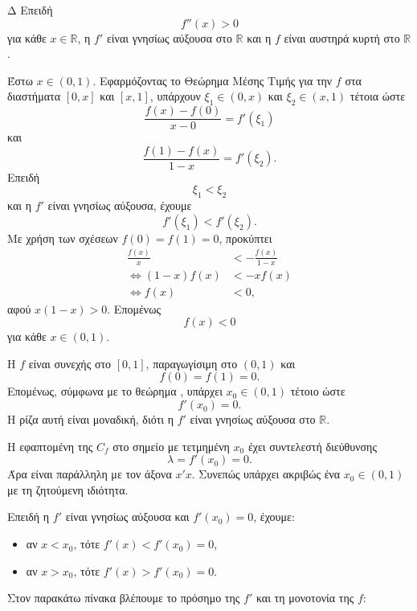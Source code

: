 \begin{thema}{Δ}
Επειδή
\[
f''(x)>0
\]
για κάθε $x\in\mathbb{R}$, η $f'$ είναι γνησίως αύξουσα στο $\mathbb{R}$ και η $f$ είναι αυστηρά κυρτή στο $\mathbb{R}$.
\begin{erwthma}
\item Έστω $x\in(0,1)$. Εφαρμόζοντας το Θεώρημα Μέσης Τιμής για την $f$ στα διαστήματα $[0,x]$ και $[x,1]$, υπάρχουν $\xi_1\in(0,x)$ και $\xi_2\in(x,1)$ τέτοια ώστε
\[
\frac{f(x)-f(0)}{x-0}=f'(\xi_1)
\]
και
\[
\frac{f(1)-f(x)}{1-x}=f'(\xi_2).
\]
Επειδή
\[
\xi_1<\xi_2
\]
και η $f'$ είναι γνησίως αύξουσα, έχουμε
\[
f'(\xi_1)<f'(\xi_2).
\]
Με χρήση των σχέσεων $f(0)=f(1)=0$, προκύπτει
\begin{align*}
\frac{f(x)}{x}
&<-\frac{f(x)}{1-x}\\
\Leftrightarrow (1-x)f(x)&<-xf(x)\\
\Leftrightarrow f(x)&<0,
\end{align*}
αφού $x(1-x)>0$. Επομένως
\[
{f(x)<0}
\]
για κάθε $x\in(0,1)$.

\item Η $f$ είναι συνεχής στο $[0,1]$, παραγωγίσιμη στο $(0,1)$ και
\[
f(0)=f(1)=0.
\]
Επομένως, σύμφωνα με το θεώρημα , υπάρχει $x_0\in(0,1)$ τέτοιο ώστε
\[
f'(x_0)=0.
\]
Η ρίζα αυτή είναι μοναδική, διότι η $f'$ είναι γνησίως αύξουσα στο $\mathbb{R}$.

Η εφαπτομένη της $C_f$ στο σημείο με τετμημένη $x_0$ έχει συντελεστή διεύθυνσης
\[
\lambda=f'(x_0)=0.
\]
Άρα είναι παράλληλη με τον άξονα $x'x$. Συνεπώς υπάρχει ακριβώς ένα $x_0\in(0,1)$ με τη ζητούμενη ιδιότητα.

\item Επειδή η $f'$ είναι γνησίως αύξουσα και $f'(x_0)=0$, έχουμε:
\begin{itemize}
\item αν $x<x_0$, τότε $f'(x)<f'(x_0)=0$,
\item αν $x>x_0$, τότε $f'(x)>f'(x_0)=0$.
\end{itemize}
Στον παρακάτω πίνακα βλέπουμε το πρόσημο της $f'$ και τη μονοτονία της $f$:
\begin{center}
\end{center}


\end{erwthma}
\end{thema}
